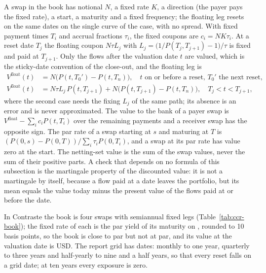 A swap in the book has notional $N$, a fixed rate $K$, a direction (the payer pays the fixed rate), a start, a maturity and a fixed frequency; the floating leg resets on the same dates on the single
curve of the case, with no spread. With fixed payment times $T_i$ and accrual fractions $\tau_i$, the fixed coupons are $c_i=N K\tau_i$. At a reset date $T_j$ the floating coupon
$N\tau L_j$ with $L_j=\big(1/P(T_j,T_{j+1})-1\big)/\tau$ is fixed and paid at $T_{j+1}$. Only the flows after the valuation date $t$ are valued, which is the sticky-date convention of the close-out, and the
floating leg is
\begin{equation}
\begin{aligned}
V^{\mathrm{float}}(t)&=N\big(P(t,T_{0}')-P(t,T_n)\big),\quad t\text{ on or before a reset, }T_0'\text{ the next reset},\\
V^{\mathrm{float}}(t)&=N\tau L_j\,P(t,T_{j+1})+N\big(P(t,T_{j+1})-P(t,T_n)\big),\quad T_j<t<T_{j+1},
\end{aligned}
\label{eq:ccr-float}
\end{equation}
where the second case needs the fixing $L_j$ of the same path; its absence is an error and is never approximated. The value to the bank of a payer swap is $V^{\mathrm{float}}-\sum_i c_i P(t,T_i)$ over the remaining payments and a receiver swap has the opposite
sign. The par rate of a swap starting at $s$ and maturing at $T$ is $(P(0,s)-P(0,T))/\sum_i\tau_i P(0,T_i)$, and a swap at its par rate has value zero at the start. The netting-set value is the sum of the swap values, never the sum of their positive parts. A check that depends on no formula
of this subsection is the martingale property of the discounted value: it is not a martingale by itself, because a flow paid at a date leaves the portfolio, but its mean equals the value today minus the present value of the flows paid at or before the date.

In Contraste the book is four swaps with semiannual fixed legs (Table~\ref{tab:ccr-book}); the fixed rate of each is the par yield of its maturity on \ccrCurveDate, rounded to 10 basis points, so the book is close to par but not at par, and its value at the valuation
date is \ccrVNetting{} USD. The report grid has \ccrGridPoints{} dates: monthly to one year, quarterly to three years and half-yearly to nine and a half years, so that every reset falls on a grid date; at ten years every exposure is zero.


